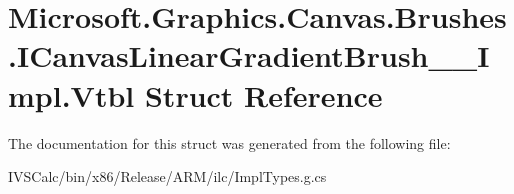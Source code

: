 \hypertarget{struct_microsoft_1_1_graphics_1_1_canvas_1_1_brushes_1_1_i_canvas_linear_gradient_brush_____impl_1_1_vtbl}{}\section{Microsoft.\+Graphics.\+Canvas.\+Brushes.\+I\+Canvas\+Linear\+Gradient\+Brush\+\_\+\+\_\+\+Impl.\+Vtbl Struct Reference}
\label{struct_microsoft_1_1_graphics_1_1_canvas_1_1_brushes_1_1_i_canvas_linear_gradient_brush_____impl_1_1_vtbl}


The documentation for this struct was generated from the following file\+:\begin{DoxyCompactItemize}
\item 
I\+V\+S\+Calc/bin/x86/\+Release/\+A\+R\+M/ilc/Impl\+Types.\+g.\+cs\end{DoxyCompactItemize}
